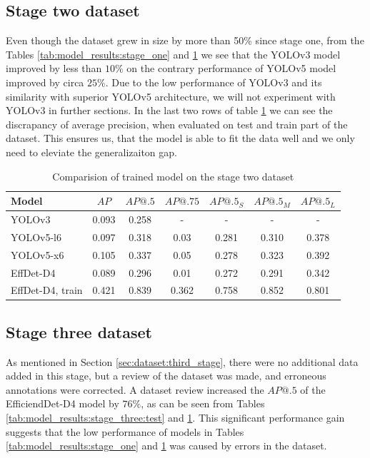 \subsection{Stage two dataset}
Even though the dataset grew in size by more than 50\% since stage one, from the Tables \ref{tab:model_results:stage_one} and \ref{tab:model_results:stage_two} we see that the YOLOv3 model improved by less than $10\%$ on the contrary performance of YOLOv5 model improved by circa $25\%$. Due to the low performance of YOLOv3 and its similarity with superior YOLOv5 architecture, we will not experiment with YOLOv3 in further sections.
In the last two rows of table \ref{tab:model_results:stage_two} we can see the discrapancy of average precision, when evaluated on test and train part of the dataset. This ensures us, that the model is able to fit the data well and we only need to eleviate the generalizaiton gap.
\begin{table}[H]
    \centering
    \begin{tabular}{|l|c|c|c|c|c|c|}
        \hline
        Model            & $AP$  & $AP@.5$ & $AP@.75$ & $AP@.5_S$ & $AP@.5_M$ & $AP@.5_L$ \\ \hline
        YOLOv3           & 0.093 & 0.258   & -        & -         & -         & -         \\ \hline
        YOLOv5-l6        & 0.097 & 0.318   & 0.03     & 0.281     & 0.310     & 0.378     \\ \hline
        YOLOv5-x6        & 0.105 & 0.337   & 0.05     & 0.278     & 0.323     & 0.392     \\ \hline
        EffDet-D4        & 0.089 & 0.296   & 0.01     & 0.272     & 0.291     & 0.342     \\ \hline
        EffDet-D4, train & 0.421 & 0.839   & 0.362    & 0.758     & 0.852     & 0.801     \\ \hline
    \end{tabular}
    \caption{Comparision of trained model on the stage two dataset}
    \label{tab:model_results:stage_two}
\end{table}

\subsection{Stage three dataset}
As mentioned in Section \ref{sec:dataset:third_stage}, there were no additional data added in this stage, but a review of the dataset was made, and erroneous annotations were corrected. A dataset review increased the $AP@.5$ of the EfficiendDet-D4 model by $76\%$, as can be seen from Tables \ref{tab:model_results:stage_three:test} and \ref{tab:model_results:stage_two}. This significant performance gain suggests that the low performance of models in Tables \ref{tab:model_results:stage_one} and \ref{tab:model_results:stage_two} was caused by errors in the dataset.

